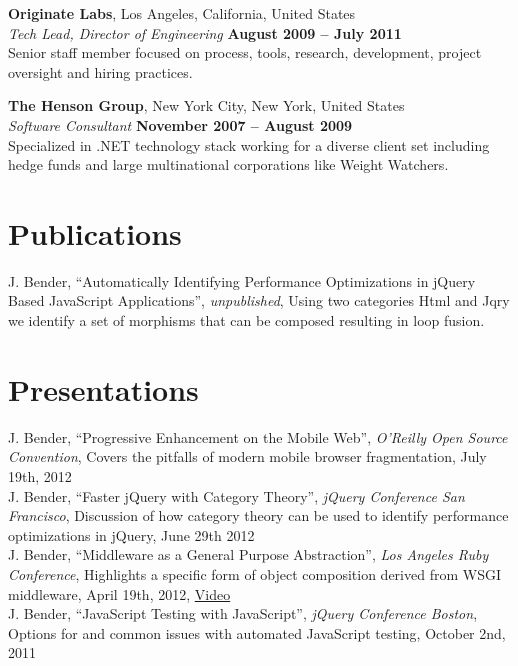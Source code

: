 \documentclass[margin,line]{resume}
\begin{document}
\begin{resume}
  \textbf{Originate Labs}, Los Angeles, California, United States \vspace{1mm}\\
  \textsl{Tech Lead, Director of Engineering} \hfill \textbf{August 2009 -- July 2011}\\
  Senior staff member focused on process, tools, research, development, project oversight and hiring practices.

  \textbf{The Henson Group}, New York City, New York, United States \vspace{1mm}\\
  \textsl{Software Consultant} \hfill \textbf{November 2007 -- August 2009}\\
  Specialized in .NET technology stack working for a diverse client set including hedge funds and large multinational corporations like Weight Watchers.

  \section{\mysidestyle Publications}
  J. Bender, ``Automatically Identifying Performance Optimizations in jQuery Based JavaScript Applications'', \textsl{unpublished}, Using two categories Html and Jqry we identify a set of morphisms that can be composed resulting in loop fusion.

  \section{\mysidestyle Presentations}
  J. Bender, ``Progressive Enhancement on the Mobile Web'', \textsl{O'Reilly Open Source Convention}, Covers the pitfalls of modern mobile browser fragmentation, July 19th, 2012\vspace{2mm}\\
  J. Bender, ``Faster jQuery with Category Theory'', \textsl{jQuery Conference San Francisco}, Discussion of how category theory can be used to identify performance optimizations in jQuery, June 29th 2012 \vspace{2mm}\\
  J. Bender, ``Middleware as a General Purpose Abstraction'', \textsl{Los Angeles Ruby Conference}, Highlights a specific form of object composition derived from WSGI middleware, April 19th, 2012, \href{http://www.youtube.com/watch?feature=player_embedded&v=fcNaiP5tea0}{Video} \vspace{2mm}\\
  J. Bender, ``JavaScript Testing with JavaScript'', \textsl{jQuery Conference Boston}, Options for and common issues with automated JavaScript testing, October 2nd, 2011


\end{resume}
\end{document}
